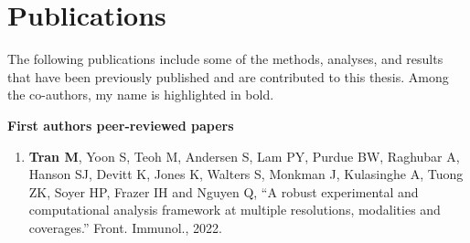 


\section*{Publications}
The following publications include some of the methods, analyses, and results that have been previously published and are contributed to this thesis. Among the co-authors, my name is highlighted in bold.
    
\textbf{First authors peer-reviewed papers}
	
	\begin{enumerate}
    \item \cite{tran2022robust} \textbf{Tran M}, Yoon S, Teoh M, Andersen S, Lam PY, Purdue BW, Raghubar A, Hanson SJ, Devitt K, Jones K, Walters S, Monkman J, Kulasinghe A, Tuong ZK, Soyer HP, Frazer IH and Nguyen Q, ``A robust experimental and computational analysis framework at multiple resolutions, modalities and coverages.'' Front. Immunol., 2022.

    \end{enumerate}
    
